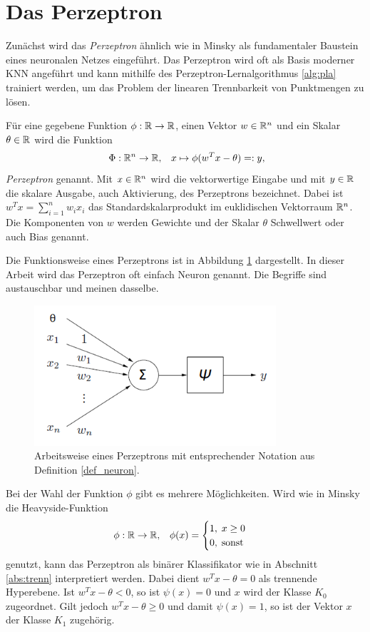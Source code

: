 \section{Das Perzeptron}
\label{perzeptron_abs}
Zunächst wird das \textit{Perzeptron} ähnlich wie in Minsky\cite{minsky2017perceptrons} als fundamentaler Baustein eines neuronalen Netzes eingeführt. Das Perzeptron wird oft als Basis moderner KNN angeführt und kann mithilfe des Perzeptron-Lernalgorithmus \ref{alg:pla} trainiert werden, um das Problem der linearen Trennbarkeit von Punktmengen zu lösen.
\begin{defi}[Perzeptron]
    \label{def_neuron}
    Für eine gegebene Funktion $\phi: \mathbb{R} \rightarrow \mathbb{R}$, einen Vektor $w \in \mathbb{R}^{n}$ und ein Skalar $\theta \in \mathbb{R}$ wird die Funktion 
    \[ \
    \Phi: \mathbb{R}^n \rightarrow \mathbb{R}, \; \; \; x \mapsto \phi(w^T x -\theta)=:y,
    \]
    \textit{Perzeptron} genannt. Mit $x \in \mathbb{R}^{n}$ wird die vektorwertige Eingabe und mit $y \in \mathbb{R}$ die skalare Ausgabe, auch Aktivierung, des Perzeptrons bezeichnet. Dabei ist $w^Tx=\sum_{i=1}^n w_i x_i$ das Standardskalarprodukt im euklidischen Vektorraum $\mathbb{R}^{n}$. Die Komponenten von $w$ werden Gewichte und der Skalar $\theta$ Schwellwert oder auch Bias genannt.
\end{defi}
Die Funktionsweise eines Perzeptrons ist in Abbildung \ref{funktionsweise_neuron} dargestellt. In dieser Arbeit wird das Perzeptron oft einfach Neuron genannt. Die Begriffe sind austauschbar und meinen dasselbe.
\begin{figure}[h]
    \includegraphics[width=0.8\textwidth]{pics/chapter_neuralnetworks/perzeptron.png}
    \centering
    \caption{Arbeitsweise eines Perzeptrons mit entsprechender Notation aus Definition \ref{def_neuron}.}
    \label{funktionsweise_neuron}
\end{figure}
Bei der Wahl der Funktion $\phi$ gibt es mehrere Möglichkeiten. Wird wie in Minsky\cite{minsky2017perceptrons} die Heavyside-Funktion
\begin{equation*}
    \phi: \mathbb{R} \rightarrow \mathbb{R}, \; \; \;
    \phi(x)=\begin{cases}
       1 , \; x \geq 0 \\
       0 , \; \text{sonst}
    \end{cases}
\end{equation*} 
genutzt, kann das Perzeptron als binärer Klassifikator wie in Abschnitt \ref{abs:trenn} interpretiert werden. Dabei dient $w^T x-\theta=0$ als trennende Hyperebene. Ist $w^Tx-\theta<0$, so ist $\psi(x)=0$ und $x$ wird der Klasse $K_{0}$ zugeordnet. Gilt jedoch $w^T x-\theta \geq 0$ und damit $\psi(x)=1$, so ist der Vektor $x$ der Klasse $K_1$ zugehörig. 

